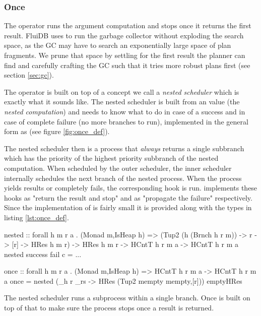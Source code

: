 \subsubsection{Once}

The  operator runs the argument computation and stops once
it returns the first result. FluiDB uses  to run the
garbage collector without exploding the search space, as the GC may
have to search an exponentially large space of plan fragments. We
prune that space by settling for the first result the planner can find
and carefully crafting the GC such that it tries more robust plans
first (see section \ref{sec:gc}).

The  operator is built on top of a concept we call a
\emph{nested scheduler} which is exactly what it sounds like.  The
nested scheduler is built from an  value (the \emph{nested
  computation}) and needs to know what to do in case of a success and
in case of complete failure (no more branches to run), implemented in
the general form as  (see figure \ref{fig:once_def}).

The nested scheduler then is a process that \emph{always} returns a
single subbranch which has the priority of the highest priority
subbranch of the nested computation. When scheduled by the outer
scheduler, the inner scheduler internally schedules the next branch of
the nested process. When the process yields results or completely
fails, the corresponding hook is run.  implements these
hooks as "return the result and stop" and as "propagate the failure"
respectively. Since the implementation of  is fairly small
it is provided along with the types in listing \ref{lst:once_def}.

\begin{code}
\begin{haskellcode}
nested
  :: forall h m r a .
  (Monad m,IsHeap h)
  => (Tup2 (h (Brnch h r m)) -> r -> [r] -> HRes h m r)
  -> HRes h m r
  -> HCntT h r m a
  -> HCntT h r m a
nested success fail c = ...

once :: forall h m r a . (Monad m,IsHeap h) => HCntT h r m a -> HCntT h r m a
once = nested (\_h r _rs -> HRes (Tup2 mempty mempty,[r])) emptyHRes
\end{haskellcode}
\caption{\label{lst:once_def}The nested scheduler runs a subprocess within a single branch. Once is built on top of that to make sure the process stops once a result is returned.}
\end{code}

